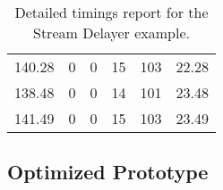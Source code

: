\begin{table}[h]
{\begin{tabular}{cccccc}
            140.28             & 0                          & 0                          & 15                         & 103                        & 22.28                  \\
            138.48             & 0                          & 0                          & 14                         & 101                        & 23.48                  \\
            141.49             & 0                          & 0                          & 15                         & 103                        & 23.49                  \\
            \bottomrule
        \end{tabular}
    }
    \caption{Detailed timings report for the Stream Delayer example.}
\end{table}


\clearpage
\subsection{Optimized Prototype}

